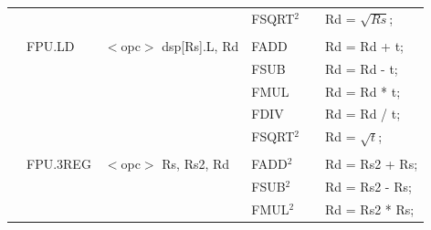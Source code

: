 \begin{table}
\begin{subtable}{\linewidth}
\begin{center}
\begin{tabular}{llllll}
                   &                   &                                       & FSQRT$^2$         & \flags{-**-}      & Rd = $\sqrt{Rs}$;                                                             \\
                   &                   &                                       &                   &                   &                                                                               \\
                   & FPU.LD            & $<$opc$>$ dsp[Rs].L, Rd               & FADD              & \flags{-**-}      & Rd = Rd + t;                                                                  \\
                   &                   &                                       & FSUB              & \flags{-**-}      & Rd = Rd - t;                                                                  \\
                   &                   &                                       & FMUL              & \flags{-**-}      & Rd = Rd * t;                                                                  \\
                   &                   &                                       & FDIV              & \flags{-**-}      & Rd = Rd / t;                                                                  \\
                   &                   &                                       & FSQRT$^2$         & \flags{-**-}      & Rd = $\sqrt{t}$;                                                              \\
                   &                   &                                       &                   &                   &                                                                               \\
                   & FPU.3REG          & $<$opc$>$ Rs, Rs2, Rd                 & FADD$^2$          & \flags{-**-}      & Rd = Rs2 + Rs;                                                                \\
                   &                   &                                       & FSUB$^2$          & \flags{-**-}      & Rd = Rs2 - Rs;                                                                \\
                   &                   &                                       & FMUL$^2$          & \flags{-**-}      & Rd = Rs2 * Rs;                                                                \\

\end{tabular}
\end{center}
\end{subtable}
\end{table}
